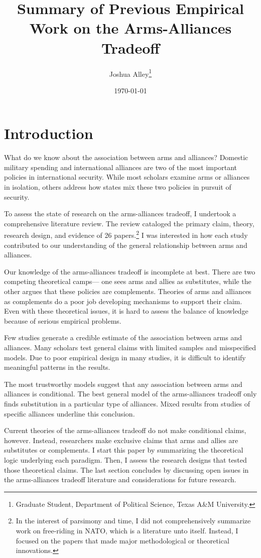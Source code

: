 \documentclass[12pt]{article}
\title{\textbf{Summary of Previous Empirical Work on the Arms-Alliances Tradeoff}}
\author{Joshua Alley\footnote{Graduate Student,
Department of Political Science, Texas A\&M University.}}
\date{{\normalsize \today}}
\begin{document}
\maketitle 


\section*{Introduction}

What do we know about the association between arms and alliances? Domestic military spending and international alliances are two of the most important policies in international security. While most scholars examine arms or alliances in isolation, others address how states mix these two policies in pursuit of security. 

To assess the state of research on the arms-alliances tradeoff, I undertook a comprehensive literature review. The review cataloged the primary claim, theory, research design, and evidence of 26 papers.\footnote{In the interest of parsimony and time, I did not comprehensively summarize work on free-riding in NATO, which is a literature unto itself. Instead, I focused on the papers that made major methodological or theoretical innovations.} I was interested in how each study contributed to our understanding of the general relationship between arms and alliances. 

Our knowledge of the arms-alliances tradeoff is incomplete at best. There are two competing theoretical camps--- one sees arms and allies as substitutes, while the other argues that these policies are complements. Theories of arms and alliances as complements do a poor job developing mechanisms to support their claim. Even with these theoretical issues, it is hard to assess the balance of knowledge because of serious empirical problems. 

Few studies generate a credible estimate of the association between arms and alliances. Many scholars test general claims with limited samples and misspecified models. Due to poor empirical design in many studies, it is difficult to identify meaningful patterns in the results. 

The most trustworthy models suggest that any association between arms and alliances is conditional. The best general model of the arms-alliances tradeoff only finds substitution in a particular type of alliances. Mixed results from studies of specific alliances underline this conclusion. 

Current theories of the arms-alliances tradeoff do not make conditional claims, however. Instead, researchers make exclusive claims that arms and allies are substitutes or complements. I start this paper by summarizing the theoretical logic underlying each paradigm. Then, I assess the research designs that tested those theoretical claims. The last section concludes by discussing open issues in the arms-alliances tradeoff literature and considerations for future research. 
\end{document}
